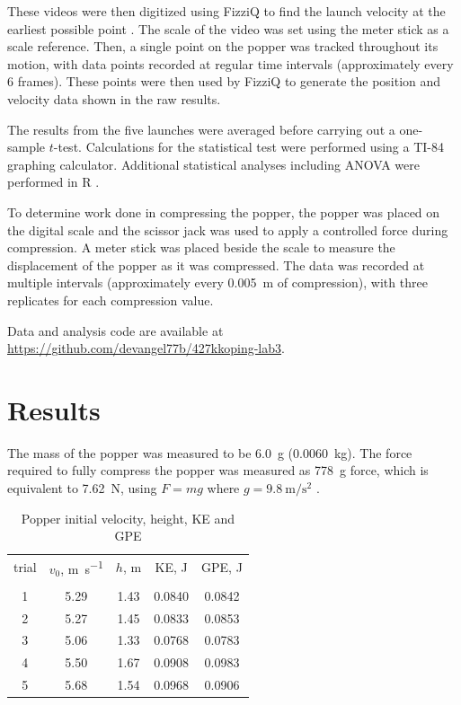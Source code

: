 \documentclass[reprint,amsmath,amssymb,aps,twoside]{revtex4-2} %
\begin{document}
These videos were then digitized using FizziQ to find the launch velocity at the earliest possible point \cite{chazot:2025:using,badmin:2026:investigation}. The scale of the video was set using the meter stick as a scale reference. Then, a single point on the popper was tracked throughout its motion, with data points recorded at regular time intervals (approximately every 6 frames). These points were then used by FizziQ to generate the position and velocity data shown in the raw results.

The results from the five launches were averaged before carrying out a one-sample $t$-test. Calculations for the statistical test were performed using a TI-84 graphing calculator. Additional statistical analyses including ANOVA were performed in R \cite{starnes:2015:practice,R,ggplot2,dplyr}. 

To determine work done in compressing the popper, the popper was placed on the digital scale and the scissor jack was used to apply a controlled force during compression. A meter stick was placed beside the scale to measure the displacement of the popper as it was compressed. The data was recorded at multiple intervals (approximately every \qty{0.005}{\meter} of compression), with  three replicates for each compression value.
    
Data and analysis code are available at \url{https://github.com/devangel77b/427kkoping-lab3}.    
    
    
    
    
    
    
    
\section{Results}
The mass of the popper was measured to be \qty{6.0}{\gram} (\qty{0.0060}{\kilo\gram}). The force required to fully compress the popper was measured as \qty{778}{\gram} force, which is equivalent to \qty{7.62}{\newton}, using $F = mg$ where $g=\qty{9.8}{\meter\per\second\squared}$ \cite{tipler,barrons,openstax}.

\begin{table}
\caption{Popper initial velocity, height, KE and GPE}
\label{tab:3132}
\begin{center}
\begin{ruledtabular}
\begin{tabular}{SSSSS}
{trial} & {$v_0$, \unit{\meter\per\second}} & {$h$, \unit{\meter}} & {KE, \unit{\joule}} & {GPE, \unit{\joule}} \\
\colrule \\
1 & 5.29 & 1.43 & 0.0840 & 0.0842 \\
2 & 5.27 & 1.45 & 0.0833 & 0.0853 \\
3 & 5.06 & 1.33 & 0.0768 & 0.0783 \\
4 & 5.50 & 1.67 & 0.0908 & 0.0983 \\
5 & 5.68 & 1.54 & 0.0968 & 0.0906 \\
\end{tabular}
\end{ruledtabular}
\end{center}
\end{table}
\end{document}
